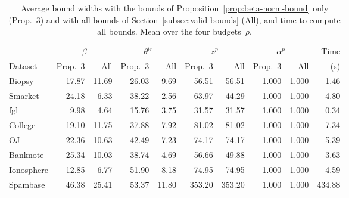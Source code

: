 \begin{table}[t]
\centering
\footnotesize
\caption{Average bound widths with the bounds of
  Proposition~\ref{prop:beta-norm-bound} only (Prop.~3) and with all bounds
  of Section~\ref{subsec:valid-bounds} (All), and time to compute all
  bounds.  Mean over the four budgets~$\rho$.}
\label{tab:bound_widths}
\begin{tabular}{@{}l rr rr rr rr r@{}}
\toprule
 & \multicolumn{2}{c}{$\beta$} & \multicolumn{2}{c}{$\theta^{tr}$}
 & \multicolumn{2}{c}{$z^p$} & \multicolumn{2}{c}{$\alpha^p$} & Time \\
\cmidrule(lr){2-3} \cmidrule(lr){4-5} \cmidrule(lr){6-7} \cmidrule(lr){8-9}
Dataset & Prop.~3 & All & Prop.~3 & All & Prop.~3 & All & Prop.~3 & All & (s) \\
\midrule
Biopsy & 17.87 & 11.69 & 26.03 & 9.69 & 56.51 & 56.51 & 1.000 & 1.000 & 1.46 \\
Smarket & 24.18 & 6.33 & 38.22 & 2.56 & 63.97 & 44.29 & 1.000 & 1.000 & 4.80 \\
fgl & 9.98 & 4.64 & 15.76 & 3.75 & 31.57 & 31.57 & 1.000 & 1.000 & 0.34 \\
College & 19.10 & 11.75 & 37.88 & 7.92 & 81.02 & 81.02 & 1.000 & 1.000 & 7.34 \\
OJ & 22.36 & 10.63 & 42.49 & 7.23 & 74.17 & 74.17 & 1.000 & 1.000 & 5.39 \\
Banknote & 25.34 & 10.03 & 38.74 & 4.69 & 56.66 & 49.88 & 1.000 & 1.000 & 3.63 \\
Ionosphere & 12.85 & 6.77 & 51.90 & 8.18 & 74.95 & 74.95 & 1.000 & 1.000 & 4.59 \\
Spambase & 46.38 & 25.41 & 53.37 & 11.80 & 353.20 & 353.20 & 1.000 & 1.000 & 434.88 \\
\bottomrule
\end{tabular}
\end{table}
